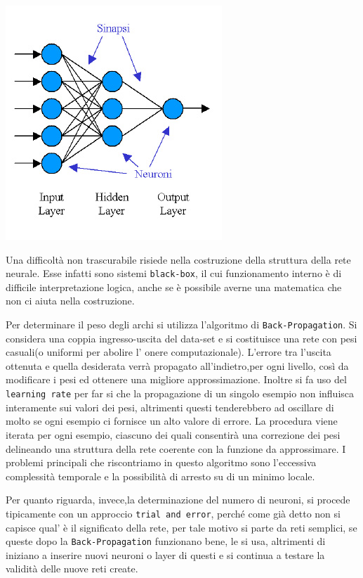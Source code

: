 			\begin{center}
				\includegraphics[scale=0.6]{RN-multilayer.jpg}
			\end{center}
			\par
			Una difficoltà non trascurabile risiede nella costruzione della struttura della rete neurale. Esse infatti sono sistemi \texttt{black-box}, il cui funzionamento interno è di difficile interpretazione logica, anche se è possibile averne una matematica che non ci aiuta nella costruzione.
			\par
			Per determinare il peso degli archi si utilizza l'algoritmo di \texttt{Back-Propagation}. Si considera una coppia ingresso-uscita del data-set e si costituisce una rete con pesi casuali(o uniformi per abolire l' onere computazionale). L'errore tra l'uscita ottenuta e quella desiderata verrà propagato all'indietro,per ogni  livello, così da modificare i pesi ed ottenere una migliore approssimazione. Inoltre si fa uso del \texttt{learning rate} per far si che la propagazione di un singolo esempio non influisca interamente sui valori dei pesi, altrimenti questi tenderebbero ad oscillare di molto se ogni esempio ci fornisce un alto valore di errore. La procedura viene iterata per ogni esempio, ciascuno dei quali consentirà una correzione dei pesi delineando una struttura della rete coerente con la funzione da approssimare. I problemi principali che riscontriamo in questo algoritmo sono l'eccessiva complessità temporale e la possibilità di arresto su di un minimo locale.\par
			Per quanto riguarda, invece,la determinazione del numero di neuroni, si procede tipicamente con un approccio \texttt{trial and error}, perché come già detto non si capisce qual' è il significato della rete, per tale motivo si parte da reti semplici, se queste dopo la \texttt{Back-Propagation} funzionano bene, le si usa, altrimenti di iniziano a inserire nuovi neuroni o layer di questi e si continua a testare la validità delle nuove reti create.\par
